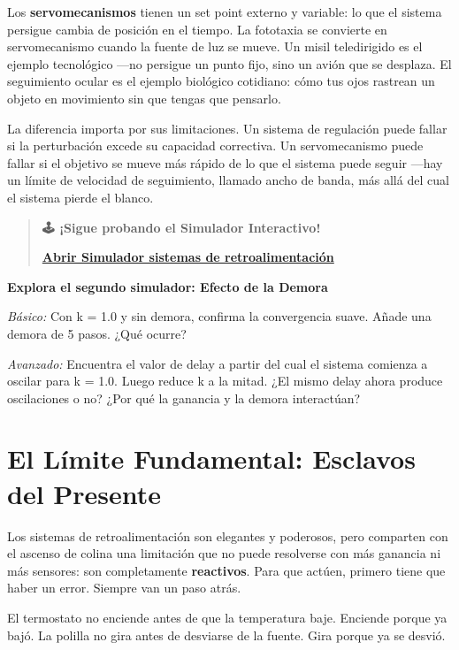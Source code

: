 \documentclass[
  letterpaper,
  DIV=11,
  numbers=noendperiod]{scrreprt}
\begin{document}
\begin{tcolorbox}[enhanced jigsaw, arc=.35mm, bottomrule=.15mm, breakable, colback=white, colframe=quarto-callout-note-color-frame, left=2mm, leftrule=.75mm, opacityback=0, rightrule=.15mm, toprule=.15mm]
Los \textbf{servomecanismos} tienen un set point externo y variable: lo
que el sistema persigue cambia de posición en el tiempo. La fototaxia se
convierte en servomecanismo cuando la fuente de luz se mueve. Un misil
teledirigido es el ejemplo tecnológico ---no persigue un punto fijo,
sino un avión que se desplaza. El seguimiento ocular es el ejemplo
biológico cotidiano: cómo tus ojos rastrean un objeto en movimiento sin
que tengas que pensarlo.

La diferencia importa por sus limitaciones. Un sistema de regulación
puede fallar si la perturbación excede su capacidad correctiva. Un
servomecanismo puede fallar si el objetivo se mueve más rápido de lo que
el sistema puede seguir ---hay un límite de velocidad de seguimiento,
llamado ancho de banda, más allá del cual el sistema pierde el blanco.

\begin{quote}
\textbf{🕹️ ¡Sigue probando el Simulador Interactivo!}

\href{https://colab.research.google.com/github/arbouria/Libro-ACA-2026/blob/main/Simuladores/retroalimentacion.ipynb}{\textbf{Abrir
Simulador sistemas de retroalimentación}}
\end{quote}

\textbf{Explora el segundo simulador: Efecto de la Demora}

\emph{Básico:} Con k = 1.0 y sin demora, confirma la convergencia suave.
Añade una demora de 5 pasos. ¿Qué ocurre?

\emph{Avanzado:} Encuentra el valor de delay a partir del cual el
sistema comienza a oscilar para k = 1.0. Luego reduce k a la mitad. ¿El
mismo delay ahora produce oscilaciones o no? ¿Por qué la ganancia y la
demora interactúan?

\section{El Límite Fundamental: Esclavos del
Presente}\label{el-luxedmite-fundamental-esclavos-del-presente}

Los sistemas de retroalimentación son elegantes y poderosos, pero
comparten con el ascenso de colina una limitación que no puede
resolverse con más ganancia ni más sensores: son completamente
\textbf{reactivos}. Para que actúen, primero tiene que haber un error.
Siempre van un paso atrás.

El termostato no enciende antes de que la temperatura baje. Enciende
porque ya bajó. La polilla no gira antes de desviarse de la fuente. Gira
porque ya se desvió.


\end{tcolorbox}
\end{document}
